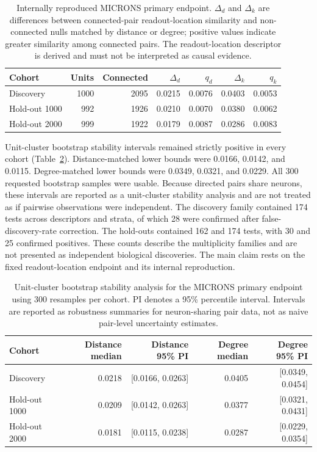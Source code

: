 \documentclass[a4paper,fleqn]{cas-sc}
\begin{document}
\begin{table}[t]
\centering
\caption{Internally reproduced MICRONS primary endpoint. $\Delta_d$ and $\Delta_k$ are differences between connected-pair readout-location similarity and non-connected nulls matched by distance or degree; positive values indicate greater similarity among connected pairs. The readout-location descriptor is derived and must not be interpreted as causal evidence.}
\label{tab:microns-primary}
\small
\begin{tabular}{lrrrrrr}
\toprule
Cohort & Units & Connected & $\Delta_d$ & $q_d$ & $\Delta_k$ & $q_k$ \\
\midrule
Discovery & 1000 & 2095 & 0.0215 & 0.0076 & 0.0403 & 0.0053 \\
Hold-out 1000 & 992 & 1926 & 0.0210 & 0.0070 & 0.0380 & 0.0062 \\
Hold-out 2000 & 999 & 1922 & 0.0179 & 0.0087 & 0.0286 & 0.0083 \\
\bottomrule
\end{tabular}
\end{table}

Unit-cluster bootstrap stability intervals remained strictly positive in every
cohort (Table~\ref{tab:microns-bootstrap}). Distance-matched lower bounds were
0.0166, 0.0142, and 0.0115. Degree-matched lower bounds were 0.0349, 0.0321,
and 0.0229. All 300 requested bootstrap samples were usable. Because directed
pairs share neurons, these intervals are reported as a unit-cluster stability
analysis and are not treated as if pairwise observations were independent. The
discovery family contained 174 tests across descriptors and strata, of which
28 were confirmed after false-discovery-rate correction. The hold-outs
contained 162 and 174 tests, with 30 and 25 confirmed positives. These counts
describe the multiplicity families and are not presented as independent
biological discoveries. The main claim rests on the fixed readout-location
endpoint and its internal reproduction.

\begin{table}[t]
\centering
\caption{Unit-cluster bootstrap stability analysis for the MICRONS primary endpoint using 300 resamples per cohort. PI denotes a 95\% percentile interval. Intervals are reported as robustness summaries for neuron-sharing pair data, not as naive pair-level uncertainty estimates.}
\label{tab:microns-bootstrap}
\small
\begin{tabular}{lrrrr}
\toprule
Cohort & Distance median & Distance 95\% PI & Degree median & Degree 95\% PI \\
\midrule
Discovery & 0.0218 & [0.0166, 0.0263] & 0.0405 & [0.0349, 0.0454] \\
Hold-out 1000 & 0.0209 & [0.0142, 0.0263] & 0.0377 & [0.0321, 0.0431] \\
Hold-out 2000 & 0.0181 & [0.0115, 0.0238] & 0.0287 & [0.0229, 0.0354] \\
\bottomrule
\end{tabular}
\end{table}
\end{document}
